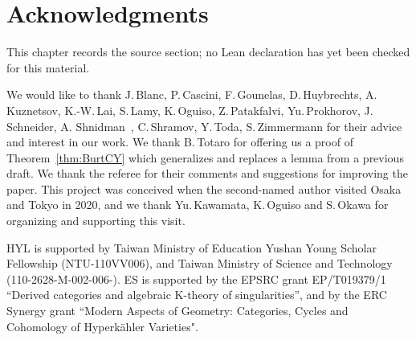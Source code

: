 \chapter{Acknowledgments}
\label{motivic-invariants-birational-maps-chapter-06}

\begin{remark}
\label{motivic-invariants-birational-maps-chapter-06-source}
This chapter records the source section; no Lean declaration has yet been checked for this material.
\notready
\end{remark}

We would like to thank
J.\,Blanc,
P.\,Cascini,
F.\,Gounelas,
D.\,Huybrechts,
A.\,Kuznetsov,
\mbox{K.-W.\,Lai,}
S.\,Lamy,
K.\,Oguiso,
Z.\,Patakfalvi,
Yu.\,Prokhorov,
J.\,Schneider,
A. Shnidman~\cite{MO-Shnidman},
C.\,Shramov,
Y.\,Toda,
S.\,Zimmermann
for their advice and interest in our work.
We thank B.\,Totaro for offering us a proof of Theorem~\ref{thm:BurtCY} which generalizes and replaces a  lemma from a previous draft.
We thank the referee for their comments and suggestions for
improving the paper.
This project was conceived when the second-named
author visited Osaka and Tokyo
in 2020, and we thank Yu.\,Kawamata,
K.\,Oguiso and S.\,Okawa for organizing and supporting this visit.

HYL is supported by
	Taiwan Ministry of Education Yushan Young Scholar Fellowship (NTU-110VV006),
	and Taiwan Ministry of Science and Technology (110-2628-M-002-006-).
	ES is supported by the EPSRC grant
    EP/T019379/1 ``Derived categories and algebraic K-theory of singularities'', and by the
    ERC Synergy grant ``Modern Aspects of Geometry: Categories, Cycles and Cohomology of Hyperkähler Varieties".
